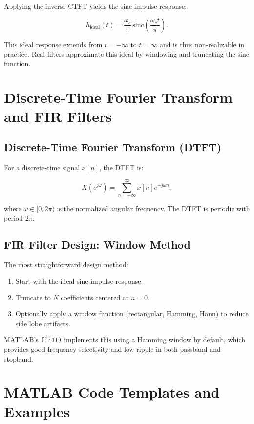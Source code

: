 \documentclass[11pt,letterpaper]{article}
\begin{document}
\noindent
Applying the inverse CTFT yields the sinc impulse response:

\begin{equation}
h_{\text{ideal}}(t) = \frac{\omega_c}{\pi} \, \text{sinc}\left(\frac{\omega_c t}{\pi}\right).
\end{equation}

\noindent
This ideal response extends from $t = -\infty$ to $t = \infty$ and is thus non-realizable in practice. Real filters approximate this ideal by windowing and truncating the sinc function.

\section{Discrete-Time Fourier Transform and FIR Filters}

\subsection{Discrete-Time Fourier Transform (DTFT)}

For a discrete-time signal $x[n]$, the DTFT is:

\begin{equation}
X(e^{j\omega}) = \sum_{n=-\infty}^{\infty} x[n] e^{-j\omega n},
\end{equation}

\noindent
where $\omega \in [0, 2\pi)$ is the normalized angular frequency. The DTFT is periodic with period $2\pi$.

\subsection{FIR Filter Design: Window Method}

The most straightforward design method:
\begin{enumerate}
    \item Start with the ideal sinc impulse response.
    \item Truncate to $N$ coefficients centered at $n = 0$.
    \item Optionally apply a window function (rectangular, Hamming, Hann) to reduce side lobe artifacts.
\end{enumerate}

\noindent
MATLAB's \texttt{fir1()} implements this using a Hamming window by default, which provides good frequency selectivity and low ripple in both passband and stopband.

\section{MATLAB Code Templates and Examples}
\end{document}
